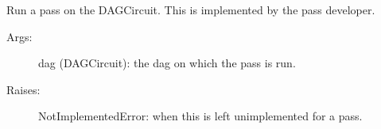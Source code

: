 \documentclass[letterpaper,10pt,english]{sphinxmanual}
\begin{document}
\begin{fulllineitems}
\begin{fulllineitems}
\label{\detokenize{Base:BaseFaultTolerance.FaultTolerance.run}}
\sphinxAtStartPar
Run a pass on the DAGCircuit. This is implemented by the pass developer.
\begin{description}
\item[{Args:}] \leavevmode
\sphinxAtStartPar
dag (DAGCircuit): the dag on which the pass is run.

\item[{Raises:}] \leavevmode
\sphinxAtStartPar
NotImplementedError: when this is left unimplemented for a pass.

\end{description}

\end{fulllineitems}


\end{fulllineitems}

\end{document}
